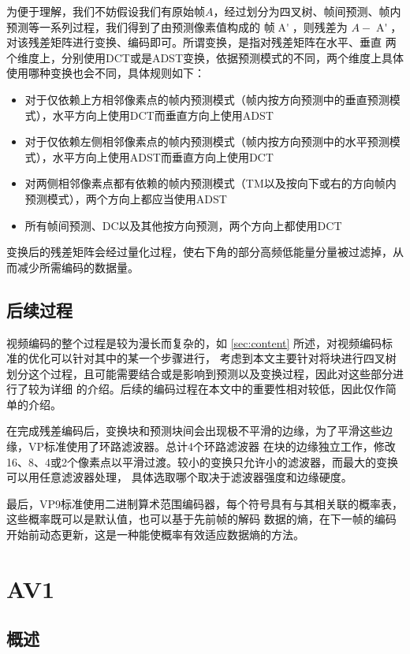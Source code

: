 为便于理解，我们不妨假设我们有原始帧$A$，经过划分为四叉树、帧间预测、帧内预测等一系列过程，我们得到了由预测像素值构成的
帧$\mathop{{A}'}$，则残差为 $A - \mathop{{A}'}$，对该残差矩阵进行变换、编码即可。所谓变换，是指对残差矩阵在水平、垂直
两个维度上，分别使用DCT或是ADST变换，依据预测模式的不同，两个维度上具体使用哪种变换也会不同，具体规则如下：

\begin{itemize}
  \item 对于仅依赖上方相邻像素点的帧内预测模式（帧内按方向预测中的垂直预测模式），水平方向上使用DCT而垂直方向上使用ADST
  \item 对于仅依赖左侧相邻像素点的帧内预测模式（帧内按方向预测中的水平预测模式），水平方向上使用ADST而垂直方向上使用DCT
  \item 对两侧相邻像素点都有依赖的帧内预测模式（TM以及按向下或右的方向帧内预测模式），两个方向上都应当使用ADST
  \item 所有帧间预测、DC以及其他按方向预测，两个方向上都使用DCT
\end{itemize}

变换后的残差矩阵会经过量化过程，使右下角的部分高频低能量分量被过滤掉，从而减少所需编码的数据量。

\subsection{后续过程}

视频编码的整个过程是较为漫长而复杂的，如 \ref{sec:content} 所述，对视频编码标准的优化可以针对其中的某一个步骤进行，
考虑到本文主要针对将块进行四叉树划分这个过程，且可能需要结合或是影响到预测以及变换过程，因此对这些部分进行了较为详细
的介绍。后续的编码过程在本文中的重要性相对较低，因此仅作简单的介绍。

在完成残差编码后，变换块和预测块间会出现极不平滑的边缘，为了平滑这些边缘，VP标准使用了环路滤波器。总计4个环路滤波器
在块的边缘独立工作，修改16、8、4或2个像素点以平滑过渡。较小的变换只允许小的滤波器，而最大的变换可以用任意滤波器处理，
具体选取哪个取决于滤波器强度和边缘硬度。

最后，VP9标准使用二进制算术范围编码器，每个符号具有与其相关联的概率表，这些概率既可以是默认值，也可以基于先前帧的解码
数据的熵，在下一帧的编码开始前动态更新，这是一种能使概率有效适应数据熵的方法。

\section{AV1}

\subsection{概述}

